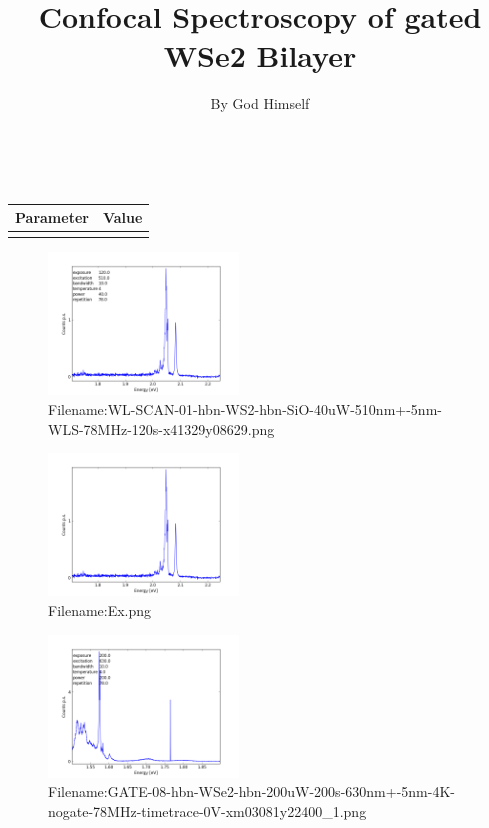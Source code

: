 \documentclass[twocolumn,english]{scrartcl}
\title{Confocal Spectroscopy of gated WSe2 Bilayer}
\author{By God Himself}
\date{\DTMdate{2017-11-17}}
\begin{document}
\maketitle
{}\\
\begin{tabular}{ll}
Parameter&Value\\
\hline\\
\end{tabular}
\begin{figure}[H]
\centering
\includegraphics[width=0.45\textwidth]{WL-SCAN-01-hbn-WS2-hbn-SiO-40uW-510nm+-5nm-WLS-78MHz-120s-x41329y08629.png}
\caption{Filename:WL-SCAN-01-hbn-WS2-hbn-SiO-40uW-510nm+-5nm-WLS-78MHz-120s-x41329y08629.png}
\end{figure}
\begin{figure}[H]
\centering
\includegraphics[width=0.45\textwidth]{Ex.png}
\caption{Filename:Ex.png}
\end{figure}
\begin{figure}[H]
\centering
\includegraphics[width=0.45\textwidth]{GATE-08-hbn-WSe2-hbn-200uW-200s-630nm+-5nm-4K-nogate-78MHz-timetrace-0V-xm03081y22400_1.png}
\caption{Filename:GATE-08-hbn-WSe2-hbn-200uW-200s-630nm+-5nm-4K-nogate-78MHz-timetrace-0V-xm03081y22400\_1.png}
\end{figure}
\end{document}
